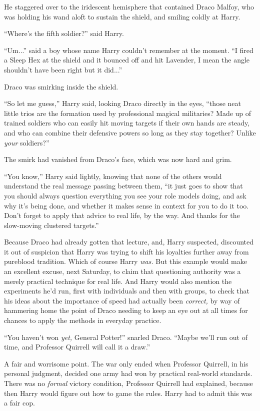 He staggered over to the iridescent hemisphere that contained Draco
Malfoy, who was holding his wand aloft to sustain the shield, and
smiling coldly at Harry.

``Where's the fifth soldier?'' said Harry.

``Um...'' said a boy whose name Harry couldn't remember at the
moment. ``I fired a Sleep Hex at the shield and it bounced off and hit
Lavender, I mean the angle shouldn't have been right but it
did...''

Draco was smirking inside the shield.

``So let me guess,'' Harry said, looking Draco directly in the eyes,
``those neat little trios are the formation used by professional magical
militaries? Made up of trained soldiers who can easily hit moving
targets if their own hands are steady, and who can combine their
defensive powers so long as they stay together? Unlike \emph{your}
soldiers?''

The smirk had vanished from Draco's face, which was now hard and grim.

``You know,'' Harry said lightly, knowing that none of the others would
understand the real message passing between them, ``it just goes to show
that you should always question everything you see your role models
doing, and ask why it's being done, and whether it makes sense in
context for you to do it too. Don't forget to apply that advice to real
life, by the way. And thanks for the slow-moving clustered targets.''

Because Draco had already gotten that lecture, and, Harry suspected,
discounted it out of suspicion that Harry was trying to shift his
loyalties further away from pureblood tradition. Which of course Harry
\emph{was.} But this example would make an excellent excuse, next
Saturday, to claim that questioning authority was a merely practical
technique for real life. And Harry would also mention the experiments
he'd run, first with individuals and then with groups, to check that his
ideas about the importance of speed had actually been \emph{correct,} by
way of hammering home the point of Draco needing to keep an eye out at
all times for chances to apply the methods in everyday practice.

``You haven't won \emph{yet,} General Potter!'' snarled Draco. ``Maybe
we'll run out of time, and Professor Quirrell will call it a draw.''

A fair and worrisome point. The war only ended when Professor Quirrell,
in his personal judgment, decided one army had won by practical
real-world standards. There was no \emph{formal} victory condition,
Professor Quirrell had explained, because then Harry would figure out
how to game the rules. Harry had to admit this was a fair cop.

